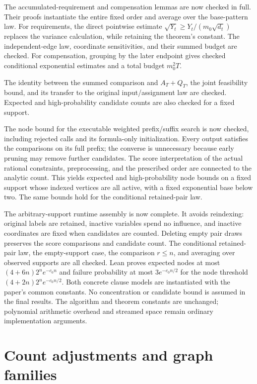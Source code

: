 \documentclass[11pt,a4paper]{article}
\begin{document}
The accumulated-requirement and compensation lemmas are now checked in
full. Their proofs instantiate the entire fixed order and average over
the base-pattern law. For requirements, the direct pointwise estimate
$\sqrt{Y_t}\ge Y_t/(m_0\sqrt{d_t})$ replaces the variance calculation,
while retaining the theorem's constant. The independent-edge law,
coordinate sensitivities, and their summed budget are checked. For
compensation, grouping by the later endpoint gives checked conditional
exponential estimates and a total budget $m_0^2T$.

The identity between the summed comparison and $A_T+Q_T$, the joint
feasibility bound, and its transfer to the original input/assignment law
are checked. Expected and high-probability candidate counts are also
checked for a fixed support.

The node bound for the executable weighted prefix/suffix search is now
checked, including rejected calls and its formula-only initialization.
Every output satisfies the comparisons on its full prefix; the converse
is unnecessary because early pruning may remove further candidates.
The score interpretation of the actual rational constraints, preprocessing,
and the prescribed order are connected to the analytic count. This yields
expected and high-probability node bounds on a fixed support whose indexed
vertices are all active, with a fixed exponential base below two. The same
bounds hold for the conditional retained-pair law.

The arbitrary-support runtime assembly is now complete. It avoids
reindexing: original labels are retained, inactive variables spend no
influence, and inactive coordinates are fixed when candidates are counted.
Deleting empty pair draws preserves the score comparisons and candidate
count. The conditional retained-pair law, the empty-support case, the
comparison $r\le n$, and averaging over observed supports are all checked.
Lean proves expected nodes at most $(4+6n)2^ne^{-c_0n}$ and failure
probability at most $3e^{-c_0n/2}$ for the node threshold
$(4+2n)2^ne^{-c_0n/2}$. Both concrete clause models are instantiated with
the paper's common constants. No concentration or candidate bound is
assumed in the final results. The algorithm and theorem constants are
unchanged; polynomial arithmetic overhead and streamed space remain
ordinary implementation arguments.

\section{Count adjustments and graph families}
\end{document}
